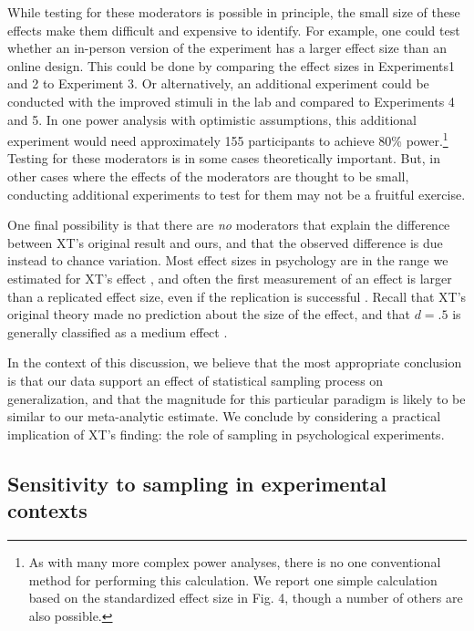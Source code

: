 \documentclass[man]{apa2}
\begin{document}
While testing for these moderators is possible in principle, the small size of these effects make them difficult and expensive to identify. For example, one could  test whether an in-person version of the experiment has a larger effect size than an online design. This could be done by comparing the effect sizes in Experiments1 and 2 to Experiment 3. Or alternatively, an additional experiment could be conducted with the improved stimuli in the lab and compared to Experiments 4 and 5.  In one power analysis with optimistic assumptions, this additional experiment would need approximately 155 participants to achieve 80\% power.\footnote{As with many more complex power analyses, there is no one conventional method for performing this calculation. We report one simple calculation based on the standardized effect size in Fig. 4, though a number of others are also possible.} Testing for these moderators is in some cases theoretically important. But, in other cases where the effects of the moderators are thought to be small, conducting additional experiments to test for them may not be a fruitful exercise.


One final possibility is that there are \emph{no} moderators that explain the difference between XT's original result and ours, and that the observed difference is due instead to chance variation. Most effect sizes in psychology are in the range we estimated for XT's effect \cite{richard2003}, and often the first measurement of an effect is larger than a replicated effect size, even if the replication is successful \cite{reproProj2015}. Recall that XT's original theory made no prediction about the size of the effect, and that $d=.5$ is generally classified as a medium effect \cite{cohen1992}.

In the context of this discussion, we believe that the most appropriate conclusion is that our data support an effect of statistical sampling process on generalization, and that the magnitude for this particular paradigm is likely to be similar to our meta-analytic estimate. We conclude by considering a practical implication of XT's finding: the role of sampling in psychological experiments.

\subsection{Sensitivity to sampling in experimental contexts}
\end{document}
